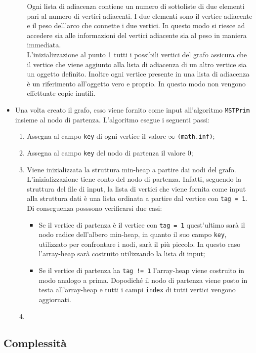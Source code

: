 \begin{itemize}
\begin{enumerate}
		Ogni lista di adiacenza contiene un numero di sottoliste di due elementi pari al numero di vertici adiacenti. I due elementi sono il vertice adiacente e il peso dell'arco che connette i due vertici. In questo modo si riesce ad accedere sia alle informazioni del vertici adiacente sia al peso in maniera immediata.\\
		L'inizializzazione al punto 1 tutti i possibili vertici del grafo assicura che il vertice che viene aggiunto alla lista di adiacenza di un altro vertice sia un oggetto definito. Inoltre ogni vertice presente in una lista di adiacenza è un riferimento all'oggetto vero e proprio. In questo modo non vengono effettuate copie inutili.
	\end{enumerate}
	\item Una volta creato il grafo, esso viene fornito come input all'algoritmo \texttt{MSTPrim} insieme al nodo di partenza. L'algoritmo esegue i seguenti passi:
	\begin{enumerate}
		\item Assegna al campo \texttt{key} di ogni vertice il valore $\infty$ \texttt{(math.inf)};
		\item Assegna al campo \texttt{key} del nodo di partenza il valore 0;
		\item Viene inizializzata la struttura min-heap a partire dai nodi del grafo. L'inizializzazione tiene conto del nodo di partenza. Infatti, seguendo la struttura del file di input, la lista di vertici che viene fornita come input alla struttura dati è una lista ordinata a partire dal vertice con \texttt{tag = 1}. Di conseguenza posssono verificarsi due casi:
		\begin{itemize}
			\item Se il vertice di partenza è il vertice con \texttt{tag = 1} quest'ultimo sarà il nodo radice dell'albero min-heap, in quanto il suo campo \texttt{key}, utilizzato per confrontare i nodi, sarà il più piccolo. In questo caso l'array-heap sarà costruito utilizzando la lista di input;
			\item Se il vertice di partenza ha \texttt{tag != 1} l'array-heap viene costruito in modo analogo a prima. Dopodiché il nodo di partenza viene posto in testa all'array-heap e tutti i campi \texttt{index} di tutti vertici vengono aggiornati.
		\end{itemize}
		\item   
	\end{enumerate}
\end{itemize}

\subsection{Complessità}
\pagebreak